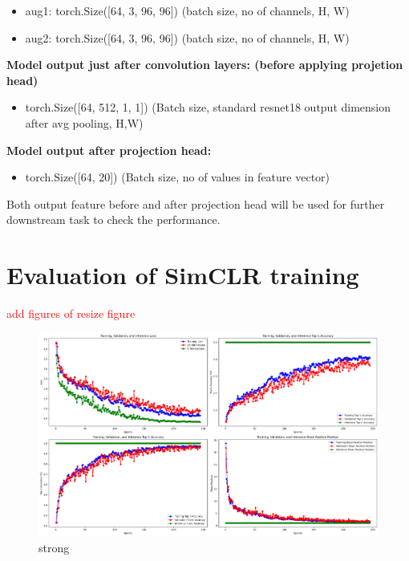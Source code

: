\begin{itemize}
  \item aug1: torch.Size([64, 3, 96, 96])        (batch size, no of channels, H, W)
  \item aug2: torch.Size([64, 3, 96, 96])        (batch size, no of channels, H, W) \vspace{1em}
\end{itemize} \vspace{1em}
\textbf{Model output just after convolution layers: (before applying projetion head)} 
\begin{itemize}
  \item torch.Size([64, 512, 1, 1]) (Batch size, standard resnet18 output dimension after avg pooling, H,W)   
\end{itemize}

\textbf{Model output after projection head:}
\begin{itemize}
  \item torch.Size([64, 20])  (Batch size, no of values in feature vector)  
\end{itemize}

Both output feature before and after projection head will be used for further downstream task to check the performance.

\section{Evaluation of SimCLR training} \label{sec:Evaluation result of SImclr}


\textcolor{red}{add figures of resize figure} 

\begin{figure}[H]
  \centering
  \includegraphics[scale=0.3]{figures/strong.png} 
  \caption{strong}
  \label{fig:strong_64}
\end{figure}

